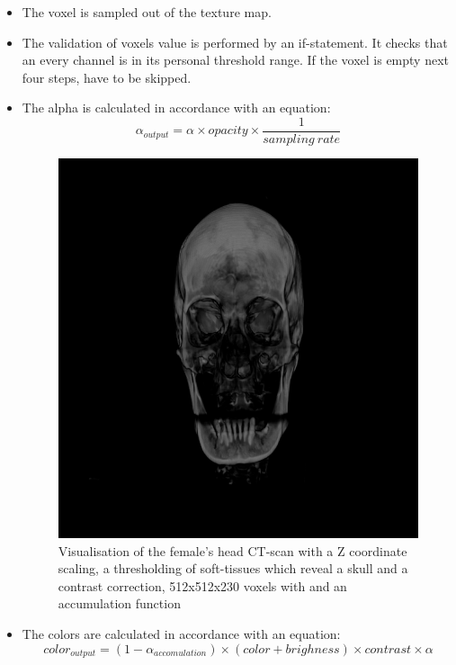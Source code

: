 \documentclass[twoside, english, 11pt]{report}
\begin{document}
\begin{itemize}
\item The voxel is sampled out of the texture map.
\item The validation of voxels value is performed by an if-statement. It checks that an every channel is in its personal threshold range. If the voxel is empty next four steps, have to be skipped.
\item The alpha is calculated in accordance with an equation:
\begin{equation} \label{eq:alpha}
\alpha_{output} = \alpha \times opacity \times \frac {1}{{sampling\ rate}}
\end{equation}
\begin{figure}[H]
\centerline{\includegraphics[scale = 0.6]{img/head-th-win}}
\caption{Visualisation of the female's head CT-scan with a Z coordinate scaling, a thresholding of soft-tissues which reveal a skull and a contrast correction, 512x512x230 voxels with and an accumulation function\label{fig:head-th-win}}
\end{figure}
\item The colors are calculated in accordance with an equation:
\begin{equation} \label{eq:color}
color_{output} = (1 - \alpha_{accomulation}) \times (color + brighness) \times contrast  \times \alpha
\end{equation}\\


\end{itemize}
\end{document}
